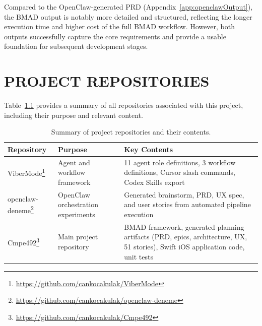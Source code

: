 \documentclass[a4paper,12pt]{report}
\begin{document}
Compared to the OpenClaw-generated PRD (Appendix~\ref{app:openclawOutput}), the BMAD output is notably more detailed and structured, reflecting the longer execution time and higher cost of the full BMAD workflow. However, both outputs successfully capture the core requirements and provide a usable foundation for subsequent development stages.

\chapter{PROJECT REPOSITORIES}
\label{app:repos}

Table~\ref{table:repos} provides a summary of all repositories associated with this project, including their purpose and relevant content.

\begin{table}[h!]
\caption[Project repositories]{Summary of project repositories and their contents.}
\begin{center}
\small
\begin{tabular}{|p{3cm}|p{4cm}|p{5.5cm}|} \hline
\textbf{Repository} & \textbf{Purpose} & \textbf{Key Contents} \\\hline
ViberMode\footnote{\url{https://github.com/cankocakulak/ViberMode}} & Agent and workflow framework & 11 agent role definitions, 3 workflow definitions, Cursor slash commands, Codex Skills export \\\hline
openclaw-deneme\footnote{\url{https://github.com/cankocakulak/openclaw-deneme}} & OpenClaw orchestration experiments & Generated brainstorm, PRD, UX spec, and user stories from automated pipeline execution \\\hline
Cmpe492\footnote{\url{https://github.com/cankocakulak/Cmpe492}} & Main project repository & BMAD framework, generated planning artifacts (PRD, epics, architecture, UX, 51 stories), Swift iOS application code, unit tests \\\hline
\end{tabular}
\label{table:repos}
\end{center}
\end{table}
\end{document}
